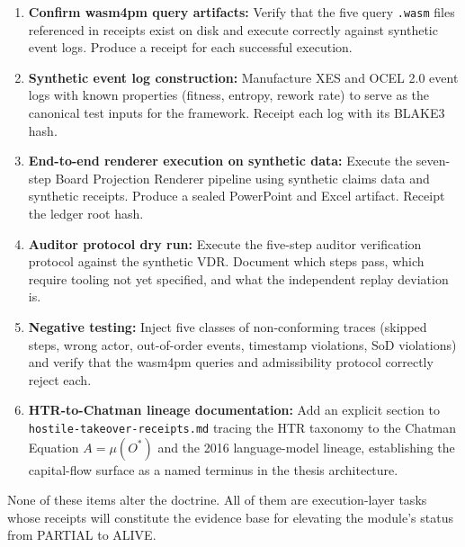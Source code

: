 \begin{enumerate}
  \item \textbf{Confirm wasm4pm query artifacts:} Verify that the five query \texttt{.wasm}
    files referenced in receipts exist on disk and execute correctly against synthetic event
    logs. Produce a receipt for each successful execution.
  \item \textbf{Synthetic event log construction:} Manufacture XES and OCEL 2.0 event logs
    with known properties (fitness, entropy, rework rate) to serve as the canonical test
    inputs for the framework. Receipt each log with its BLAKE3 hash.
  \item \textbf{End-to-end renderer execution on synthetic data:} Execute the seven-step
    Board Projection Renderer pipeline using synthetic claims data and synthetic receipts.
    Produce a sealed PowerPoint and Excel artifact. Receipt the ledger root hash.
  \item \textbf{Auditor protocol dry run:} Execute the five-step auditor verification
    protocol against the synthetic VDR. Document which steps pass, which require tooling
    not yet specified, and what the independent replay deviation is.
  \item \textbf{Negative testing:} Inject five classes of non-conforming traces (skipped
    steps, wrong actor, out-of-order events, timestamp violations, SoD violations) and
    verify that the wasm4pm queries and admissibility protocol correctly reject each.
  \item \textbf{HTR-to-Chatman lineage documentation:} Add an explicit section to
    \texttt{hostile-takeover-receipts.md} tracing the HTR taxonomy to the Chatman Equation
    $A = \mu(O^*)$ and the 2016 language-model lineage, establishing the capital-flow
    surface as a named terminus in the thesis architecture.
\end{enumerate}

None of these items alter the doctrine. All of them are execution-layer tasks whose
receipts will constitute the evidence base for elevating the module's status from PARTIAL
to ALIVE.

